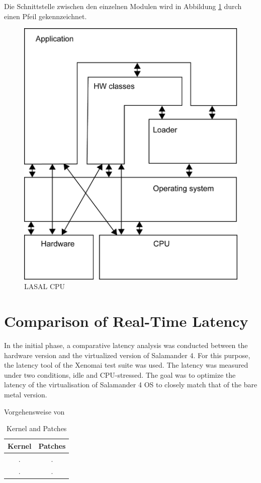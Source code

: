 \documentclass[MMR,Master,english]{twbook}
\begin{document}
  Die Schnittstelle zwischen den einzelnen Modulen wird in Abbildung \ref{fig:lasal_cpu} durch einen Pfeil gekennzeichnet.

  \begin{figure}[!h]
    \centering
    \includegraphics[width=0.5\columnwidth]{img/Software-Struktur_einer_LASAL_CPU.png}
    \caption[LASAL CPU]{LASAL CPU}
    \label{fig:lasal_cpu}
  \end{figure}

\clearpage


\chapter{Comparison of Real-Time Latency}
In the initial phase, a comparative latency analysis was conducted between the hardware version and the virtualized version of Salamander 4. For this purpose, the latency tool of the Xenomai test suite was used. The latency was measured under two conditions, idle and CPU-stressed. The goal was to optimize the latency of the virtualisation of Salamander 4 OS to closely match that of the bare metal version. 

Vorgehensweise von \cite{linPerformanceEvaluationXenomai}




\begin{table}[H]
    \centering
    \caption[Kernel and Patches]{Kernel and Patches}
    \label{tab:kernel_configuration}
    \begin{tabular}{|c|c|}
        \hline
        \textbf{Kernel} & \textbf{Patches} \\ \hline
        . & .  \\ \hline
        . & .  \\ \hline
    \end{tabular}
\end{table}
\end{document}
